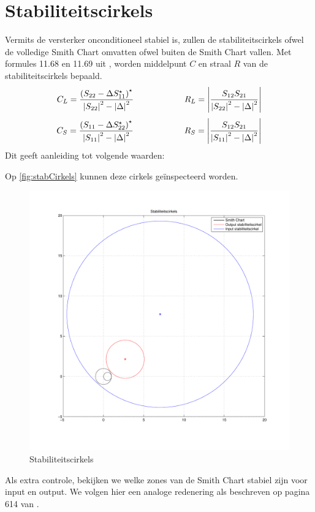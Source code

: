   \section{Stabiliteitscirkels}
    Vermits de versterker onconditioneel stabiel is, zullen de stabiliteitscirkels
    ofwel de volledige Smith Chart omvatten ofwel buiten de Smith Chart vallen.
    Met formules 11.68 en 11.69 uit \cite{Pozar}, worden middelpunt $C$ en
    straal $R$ van de stabiliteitscirkels bepaald.
    \[
      C_L = \frac{\left(S_{22} - \Delta S_{11}^{\star}\right)^{\star}}{\left| S_{22} \right|^2 - \left|\Delta\right|^2}
      \qquad \qquad \qquad
      R_L = \left| \frac{S_{12}S_{21}}{\left| S_{22} \right|^2 - \left|\Delta\right|^2}\right|
    \]
    \[
      C_S = \frac{\left(S_{11} - \Delta S_{22}^{\star}\right)^{\star}}{\left| S_{11} \right|^2 - \left|\Delta\right|^2}
      \qquad \qquad \qquad
      R_S = \left| \frac{S_{12}S_{21}}{\left| S_{11} \right|^2 - \left|\Delta\right|^2}\right|
    \]
    Dit geeft aanleiding tot volgende waarden:
    
    
    Op \autoref{fig:stabCirkels} kunnen deze cirkels ge\"inspecteerd worden.
    \begin{figure}[!h]
      \centering
      \includegraphics[width=\textwidth,keepaspectratio=true]{fig/stabiliteitscirkels.pdf}  
      \caption{Stabiliteitscirkels} 
      \label{fig:stabCirkels}
    \end{figure}
    Als extra controle, bekijken we welke zones van de Smith Chart stabiel zijn voor input en output. We volgen hier
    een analoge redenering als beschreven op pagina 614 van \cite{Pozar}.
    
